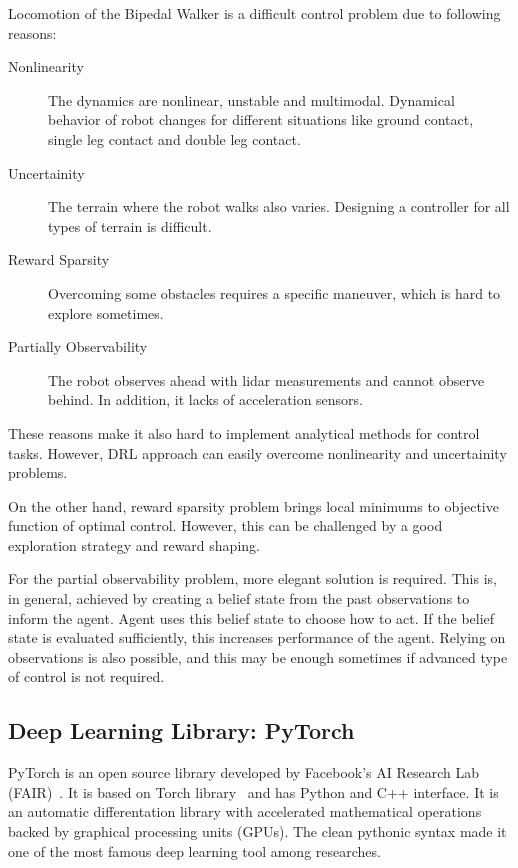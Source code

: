 Locomotion of the Bipedal Walker is a difficult control problem due to following reasons: 
\begin{description}
	\item[Nonlinearity] The dynamics are nonlinear, unstable and multimodal. 
	Dynamical behavior of robot changes for different situations 
	like ground contact, single leg contact and double leg contact.
	\item[Uncertainity] The terrain where the robot walks also varies. 
	Designing a controller for all types of terrain is difficult.
	\item[Reward Sparsity] Overcoming some obstacles requires a specific maneuver, which is hard to explore sometimes.	
	\item[Partially Observability] The robot observes 
	ahead with lidar measurements and cannot observe behind. 
	In addition, it lacks of acceleration sensors.
\end{description}

These reasons make it also hard to implement analytical methods for control tasks. 
However, DRL approach can easily overcome nonlinearity and uncertainity problems.

On the other hand, reward sparsity problem brings local minimums to objective function of optimal control. However, this can be challenged by a good exploration strategy and reward shaping. 

For the partial observability problem, more elegant solution is required. 
This is, in general, achieved by creating a belief state from the past observations to inform the agent. 
Agent uses this belief state to choose how to act. 
If the belief state is evaluated sufficiently, 
this increases performance of the agent.
Relying on observations is also possible, 
and this may be enough sometimes if advanced type of control is not required. 

\subsection{Deep Learning Library: PyTorch}
\label{dl_pytorch}
PyTorch is an open source library developed by Facebook's AI Research Lab (FAIR)~\cite{paszke_pytorch_2019}. 
It is based on Torch library~\cite{collobert_torch7_2011} and has Python and C++ interface. 
It is an automatic differentation library with accelerated mathematical operations backed by graphical processing units (GPUs). 
The clean pythonic syntax made it one of the most famous deep learning tool among researches. 
